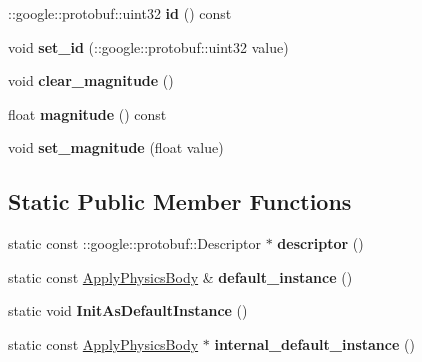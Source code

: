 \begin{DoxyCompactItemize}
\+::google\+::protobuf\+::uint32 {\bfseries id} () const
\item 
\mbox{\label{classtbBasics_1_1ApplyPhysicsBody_a3622c8051c8ad889f98caa0066ba3232}} 
void {\bfseries set\+\_\+id} (\+::google\+::protobuf\+::uint32 value)
\item 
\mbox{\label{classtbBasics_1_1ApplyPhysicsBody_abe4eaf91d3d71c9c2b91256646088fe4}} 
void {\bfseries clear\+\_\+magnitude} ()
\item 
\mbox{\label{classtbBasics_1_1ApplyPhysicsBody_af9ea486ab09fef38b5a68bd929d5d67e}} 
float {\bfseries magnitude} () const
\item 
\mbox{\label{classtbBasics_1_1ApplyPhysicsBody_a205189469c5267768fef540a1ce38ccf}} 
void {\bfseries set\+\_\+magnitude} (float value)
\end{DoxyCompactItemize}
\subsection*{Static Public Member Functions}
\begin{DoxyCompactItemize}
\item 
\mbox{\label{classtbBasics_1_1ApplyPhysicsBody_aed11b34842b8bdd9efb5e6ae787d5433}} 
static const \+::google\+::protobuf\+::\+Descriptor $\ast$ {\bfseries descriptor} ()
\item 
\mbox{\label{classtbBasics_1_1ApplyPhysicsBody_aa5d64c13e3c27fa45af3ea8d095c2738}} 
static const \hyperlink{classtbBasics_1_1ApplyPhysicsBody}{Apply\+Physics\+Body} \& {\bfseries default\+\_\+instance} ()
\item 
\mbox{\label{classtbBasics_1_1ApplyPhysicsBody_aa8e8a71f01ce92c86d4447e6dabfcece}} 
static void {\bfseries Init\+As\+Default\+Instance} ()
\item 
\mbox{\label{classtbBasics_1_1ApplyPhysicsBody_a1e7389e7c6ebc417e82f62ea5133a477}} 
static const \hyperlink{classtbBasics_1_1ApplyPhysicsBody}{Apply\+Physics\+Body} $\ast$ {\bfseries internal\+\_\+default\+\_\+instance} ()
\end{DoxyCompactItemize}
